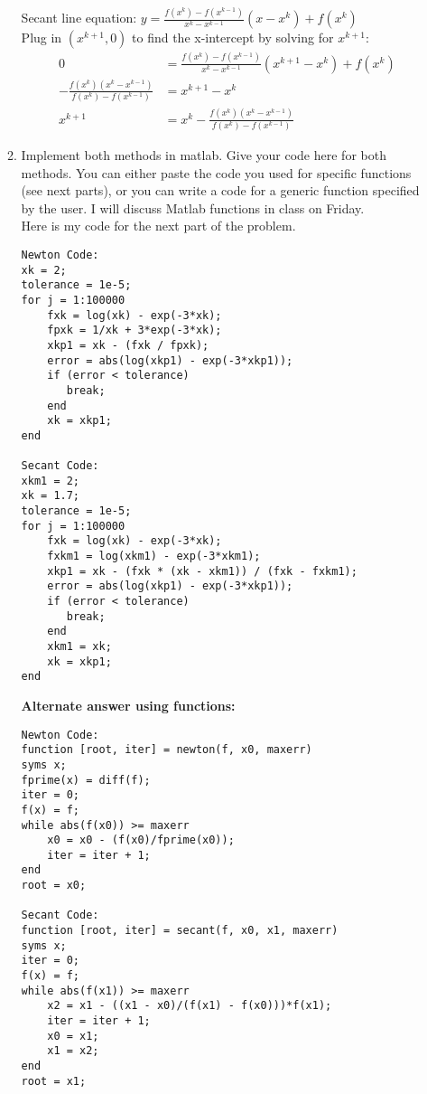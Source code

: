 \documentclass[11pt]{amsart}
\theoremstyle{plain}
\theoremstyle{definition}
\begin{document}
\begin{enumerate}
\begin{enumerate}
Secant line equation: $y = \frac{f(x^k) - f(x^{k-1})}{x^k - x^{k-1}}(x - x^k) + f(x^k)$ \\
Plug in $(x^{k+1}, 0)$ to find the x-intercept by solving for $x^{k+1}$:
\begin{align} \nonumber
0 &= \frac{f(x^k) - f(x^{k-1})}{x^k - x^{k-1}}(x^{k+1} - x^k) + f(x^k) \\ \nonumber
-\frac{f(x^k)(x^k - x^{k-1})}{f(x^k) - f(x^{k-1})} &= x^{k+1} - x^k \\ \nonumber
x^{k+1} &= x^k -\frac{f(x^k)(x^k - x^{k-1})}{f(x^k) - f(x^{k-1})}
\end{align}

\bigskip
\item Implement both methods in matlab. Give your code here for both methods. 
You can either paste the code you used for specific functions (see next parts), 
or you can write a code for a generic function specified by the user. I will discuss
Matlab functions in class on Friday. \\

Here is my code for the next part of the problem. \\

\begin{verbatim}
Newton Code:
xk = 2;
tolerance = 1e-5;
for j = 1:100000
    fxk = log(xk) - exp(-3*xk);
    fpxk = 1/xk + 3*exp(-3*xk);
    xkp1 = xk - (fxk / fpxk);
    error = abs(log(xkp1) - exp(-3*xkp1));
    if (error < tolerance)
       break;
    end
    xk = xkp1;
end

Secant Code:
xkm1 = 2;
xk = 1.7;
tolerance = 1e-5;
for j = 1:100000
    fxk = log(xk) - exp(-3*xk);
    fxkm1 = log(xkm1) - exp(-3*xkm1);
    xkp1 = xk - (fxk * (xk - xkm1)) / (fxk - fxkm1);
    error = abs(log(xkp1) - exp(-3*xkp1));
    if (error < tolerance)
       break;
    end
    xkm1 = xk;
    xk = xkp1;
end
\end{verbatim}

\bigskip

{\bf Alternate answer using functions: }
\begin{verbatim}
Newton Code:
function [root, iter] = newton(f, x0, maxerr)
syms x;
fprime(x) = diff(f);
iter = 0;
f(x) = f;
while abs(f(x0)) >= maxerr
    x0 = x0 - (f(x0)/fprime(x0));
    iter = iter + 1;
end
root = x0;
	
Secant Code:
function [root, iter] = secant(f, x0, x1, maxerr)
syms x;
iter = 0;
f(x) = f;
while abs(f(x1)) >= maxerr
    x2 = x1 - ((x1 - x0)/(f(x1) - f(x0)))*f(x1);
    iter = iter + 1;
    x0 = x1;
    x1 = x2;
end
root = x1;
\end{verbatim}





\end{enumerate}
\end{enumerate}
\end{document}
